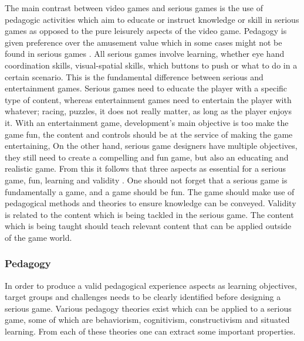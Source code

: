 The main contrast between video games and serious games is the use of pedagogic activities which aim to educate or instruct knowledge or skill \cite{zyda2005visual} in serious games as opposed to the pure leisurely aspects of the video game. Pedagogy is given preference over the amusement value which in some cases might not be found in serious games \cite{zyda2005visual}. All serious games involve learning, whether eye hand coordination skills, visual-spatial skills,  which buttons to push or what to do in a certain scenario. This is the fundamental difference between serious and entertainment games. Serious games need to educate the player with a specific type of content, whereas entertainment games need to entertain the player with whatever; racing, puzzles, it does not really matter, as long as the player enjoys it\cite{Harteveld2007}. With an entertainment game, development's main objective is too make the game fun, the content and controls should be at the service of making the game entertaining, On the other hand, serious game designers have multiple objectives, they still need to create a compelling and fun game, but also an educating and realistic game.  From this it follows that three aspects as essential for a serious game, fun, learning and validity \cite{Harteveld2007}. One should not forget that a serious game is fundamentally a game, and a game should be fun. The game should make use of pedagogical methods and theories to ensure knowledge can be conveyed. Validity is related to the content which is being tackled in the serious game. The content which is being taught should teach relevant content that can be applied outside of the game world.

\subsubsection{Pedagogy}
In order to produce a valid pedagogical experience aspects as learning objectives, target groups and challenges needs to be clearly identified before designing a serious game\cite{moser2002methodology}. Various pedagogy theories exist which can be applied to a serious game, some of which are behaviorism, cognitivism, constructivism and situated learning\cite{egenfeldt2005beyond}. From each of these theories one can extract some important properties. 

